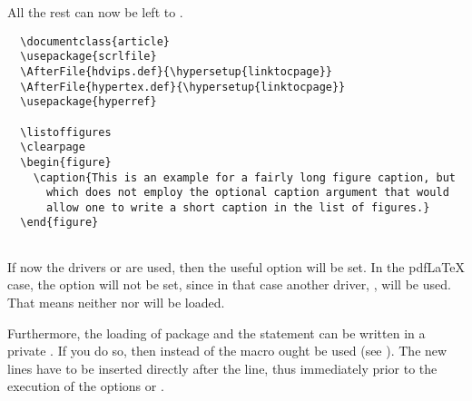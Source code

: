\begin{Example}
All the rest can now be left to .
\begin{lstlisting}
  \documentclass{article}
  \usepackage{scrlfile}
  \AfterFile{hdvips.def}{\hypersetup{linktocpage}}
  \AfterFile{hypertex.def}{\hypersetup{linktocpage}}
  \usepackage{hyperref}
  
  \listoffigures
  \clearpage
  \begin{figure}
    \caption{This is an example for a fairly long figure caption, but
      which does not employ the optional caption argument that would
      allow one to write a short caption in the list of figures.}
  \end{figure}
  
\end{lstlisting}
If now the  drivers  or
 are used, then the useful  option
 will be set. In the pdf{\LaTeX} case, the option
will not be set, since in that case another  driver,
, will be used. That means neither 
nor  will be loaded.
\end{Example}

\begin{Explain}
  Furthermore, the loading of package  and the
   statement can be written in a private
  .  If you do so, then instead of
   the macro  ought be used
  (see \cite{latex:clsguide}).  The new lines have to be inserted
  directly after the  line, thus immediately prior
  to the execution of the options  or .
\end{Explain}%

